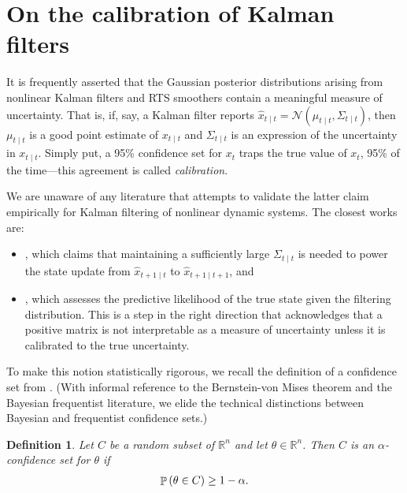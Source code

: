 \documentclass{article} %
\newtheorem{definition}{Definition}
\DeclareMathOperator{\probability}{\mathbb{P}}
\begin{document}
\section{On the calibration of Kalman filters}
It is frequently asserted that the Gaussian posterior distributions arising from nonlinear Kalman filters and RTS smoothers contain a meaningful measure of uncertainty.
That is, if, say, a Kalman filter reports \(\hat x_{t \mid t} = \mathcal N(\mu_{t \mid t}, \Sigma_{t \mid t})\), then \(\mu_{t \mid t}\) is a good point estimate of \(x_{t \mid t}\) and \(\Sigma_{t \mid t}\) is an expression of the uncertainty in \(x_{t \mid t}\).
Simply put, a 95\% confidence set for \(x_t\) traps the true value of \(x_t\), 95\% of the time---this agreement is called \emph{calibration}.

We are unaware of any literature that attempts to validate the latter claim empirically for Kalman filtering of nonlinear dynamic systems.
The closest works are:
\begin{itemize}
  \item \citet{jiang_new_2025}, which claims that maintaining a sufficiently large \(\Sigma_{t \mid t}\) is needed to power the state update from \(\hat x_{t+1 \mid t}\) to \(\hat x_{t+1 \mid t+1}\), and
  \item \citet{deisenroth_analytic_2009}, which assesses the predictive likelihood of the true state given the filtering distribution.
  This is a step in the right direction that acknowledges that a positive matrix is not interpretable as a measure of uncertainty unless it is calibrated to the true uncertainty.
\end{itemize}

To make this notion statistically rigorous, we recall the definition of a confidence set from \citet[\S6.3.2]{wasserman_all_2004}.
(With informal reference to the Bernstein-von Mises theorem and the Bayesian frequentist literature, we elide the technical distinctions between Bayesian and frequentist confidence sets.)

\begin{definition}
Let \(C\) be a random subset of \(\mathbb R^{n}\) and let \(\theta \in \mathbb{R}^n\).
Then \(C\) is an \(\alpha\)-confidence set for \(\theta\) if
\begin{align*}
\probability\del{\theta \in C} \geq 1-\alpha.
\end{align*}
\end{definition}
\end{document}
